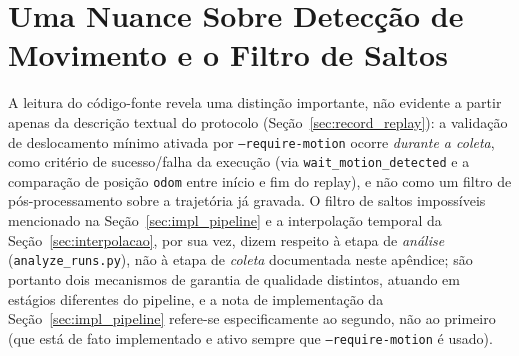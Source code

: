 \section{Uma Nuance Sobre Detecção de Movimento e o Filtro de Saltos}

A leitura do código-fonte revela uma distinção importante, não evidente a partir
apenas da descrição textual do protocolo (Seção~\ref{sec:record_replay}): a
validação de deslocamento mínimo ativada por \texttt{--require-motion} ocorre
\emph{durante a coleta}, como critério de sucesso/falha da execução (via
\texttt{wait\_\allowbreak motion\_\allowbreak detected} e a comparação de posição \texttt{odom} entre
início e fim do replay), e não como um filtro de pós-processamento sobre a
trajetória já gravada. O filtro de saltos impossíveis mencionado na
Seção~\ref{sec:impl_pipeline} e a interpolação temporal da
Seção~\ref{sec:interpolacao}, por sua vez, dizem respeito à etapa de
\emph{análise} (\texttt{analyze\_\allowbreak runs.py}), não à etapa de \emph{coleta}
documentada neste apêndice; são portanto dois mecanismos de garantia de
qualidade distintos, atuando em estágios diferentes do pipeline, e a nota de
implementação da Seção~\ref{sec:impl_pipeline} refere-se especificamente ao
segundo, não ao primeiro (que está de fato implementado e ativo sempre que
\texttt{--require-motion} é usado).
